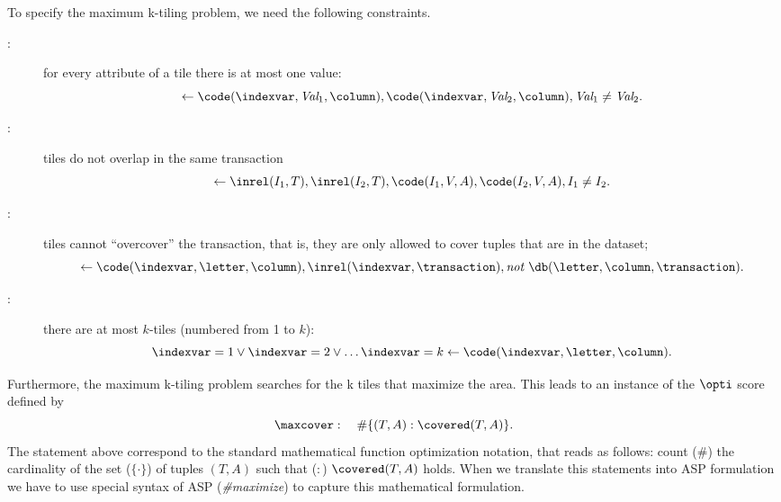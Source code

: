 To specify the maximum k-tiling problem, we need the following constraints.
\begin{description}
  \item[\onevalueConstraint:] for every attribute of a tile there is at most one value:
\begin{equation}
  \leftarrow \code(\indexvar,\textit{Val}_1, \column),\code(\indexvar,\textit{Val}_2, \column),\textit{Val}_1\neq \textit{Val}_2.  \label{def:tiling_conjunctive} 
\end{equation}
\item[\intersectionConstraint:] tiles do not overlap in the same transaction %
\begin{equation}
\leftarrow \inrel(I_1,T), \inrel(I_2,T), \code(I_1,V,A), \code(I_2,V,A), I_1 \neq I_2. \label{def:non_intersect} 
\end{equation}
  \item[\overcoverageConstraint:] tiles cannot ``overcover'' the transaction, that is, they are only allowed to cover tuples that are in the dataset;   
\begin{equation}
\leftarrow  \code(\indexvar,\letter, \column),\inrel(\indexvar,\transaction), \textit{not } \db(\letter, \column, \transaction). \label{def:pure_tiling}
\end{equation}
\item[\ktiles:] there are at most $k$-tiles (numbered from 1 to $k$): 
\begin{equation*}
   \indexvar = 1 \vee \indexvar = 2 \vee \dots \indexvar = k \leftarrow \code(\indexvar,\letter, \column).%
\end{equation*}
\end{description}
Furthermore, the maximum k-tiling problem searches for the k tiles that maximize the area. This leads to an instance of the $\opti$ score defined by
  \begin{equation}
\maxcover: \quad \#\{ (T,A) : \covered(T,A) \}.  \label{eqn:coverage-opt} 
  \end{equation}
  The statement above correspond to the standard mathematical function optimization notation, that reads as follows: count (\#) the cardinality of the set ($\{ \cdot \}$) of tuples $(T,A)$ such that ($:$) $\covered(T,A)$ holds. When we translate this statements into ASP formulation we have to use special syntax of ASP (\textit{\#maximize}) to capture this mathematical formulation.
 
